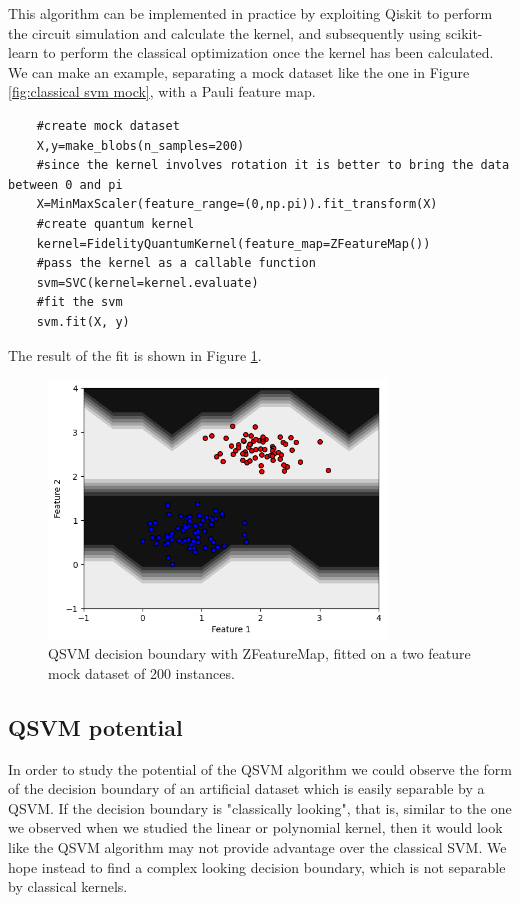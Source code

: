 \documentclass[12pt]{article}
\begin{document}
This algorithm can be implemented in practice by exploiting Qiskit to perform the circuit simulation and calculate the kernel, and subsequently using scikit-learn to perform the classical optimization once the kernel has been calculated. We can make an example, separating a mock dataset like the one in Figure \ref{fig:classical svm mock}, with a Pauli feature map. 

\begin{lstlisting}
    #create mock dataset
    X,y=make_blobs(n_samples=200) 
    #since the kernel involves rotation it is better to bring the data between 0 and pi
    X=MinMaxScaler(feature_range=(0,np.pi)).fit_transform(X) 
    #create quantum kernel
    kernel=FidelityQuantumKernel(feature_map=ZFeatureMap()) 
    #pass the kernel as a callable function 
    svm=SVC(kernel=kernel.evaluate) 
    #fit the svm
    svm.fit(X, y) 
\end{lstlisting}

The result of the fit is shown in Figure \ref{fig:qsvm}.
\begin{figure}[h!]
    \centering
    \includegraphics[width=0.8\textwidth]{images/qsvm.png}
    \caption{QSVM decision boundary with ZFeatureMap, fitted on a two feature mock dataset of 200 instances.}
    \label{fig:qsvm}
\end{figure}

\subsection{QSVM potential}
In order to study the potential of the QSVM algorithm we could observe the form of the decision boundary of an artificial dataset which is easily separable by a QSVM. If the decision boundary is "classically looking", that is, similar to the one we observed when we studied the linear or polynomial kernel, then it would look like the QSVM algorithm may not provide advantage over the classical SVM. We hope instead to find a complex looking decision boundary, which is not separable by classical kernels. 
\end{document}
